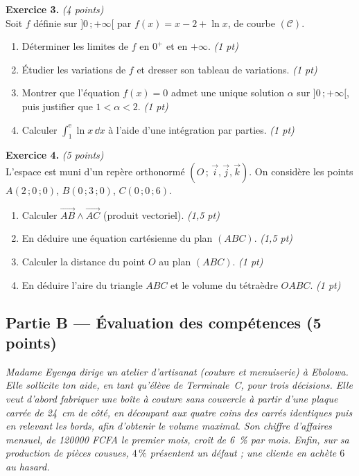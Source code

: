 \smallskip
\noindent\textbf{Exercice 3.} \hfill\textit{(4 points)}\\
Soit $f$ définie sur $]0\,;+\infty[$ par $f(x)=x-2+\ln x$, de courbe $(\mathcal{C})$.
\begin{enumerate}[label=\arabic*)]
\item Déterminer les limites de $f$ en $0^+$ et en $+\infty$. \hfill\textit{(1 pt)}
\item Étudier les variations de $f$ et dresser son tableau de variations. \hfill\textit{(1 pt)}
\item Montrer que l'équation $f(x)=0$ admet une unique solution $\alpha$ sur $]0\,;+\infty[$, puis
justifier que $1<\alpha<2$. \hfill\textit{(1 pt)}
\item Calculer $\displaystyle\int_1^{\mathrm{e}}\ln x\,\dd x$ à l'aide d'une intégration par parties. \hfill\textit{(1 pt)}
\end{enumerate}

\smallskip
\noindent\textbf{Exercice 4.} \hfill\textit{(5 points)}\\
L'espace est muni d'un repère orthonormé $(O\,;\,\vec i,\vec j,\vec k)$. On considère les points
$A(2\,;0\,;0)$, $B(0\,;3\,;0)$, $C(0\,;0\,;6)$.
\begin{enumerate}[label=\arabic*)]
\item Calculer $\vec{AB}\wedge\vec{AC}$ (produit vectoriel). \hfill\textit{(1,5 pt)}
\item En déduire une équation cartésienne du plan $(ABC)$. \hfill\textit{(1,5 pt)}
\item Calculer la distance du point $O$ au plan $(ABC)$. \hfill\textit{(1 pt)}
\item En déduire l'aire du triangle $ABC$ et le volume du tétraèdre $OABC$. \hfill\textit{(1 pt)}
\end{enumerate}

\subsection*{Partie B — Évaluation des compétences \hfill (5 points)}

\noindent\textit{Madame Eyenga dirige un atelier d'artisanat (couture et menuiserie) à Ebolowa.
Elle sollicite ton aide, en tant qu'élève de Terminale~C, pour trois décisions. Elle veut
d'abord fabriquer une boîte à couture \emph{sans couvercle} à partir d'une plaque carrée de
\SI{24}{\centi\metre} de côté, en découpant aux quatre coins des carrés identiques puis en
relevant les bords, afin d'obtenir le \emph{volume maximal}. Son chiffre d'affaires mensuel,
de \SI{120000}{} FCFA le premier mois, croît de \SI{6}{\percent} par mois. Enfin, sur sa
production de pièces cousues, $4\,\%$ présentent un défaut ; une cliente en achète $6$ au hasard.}

